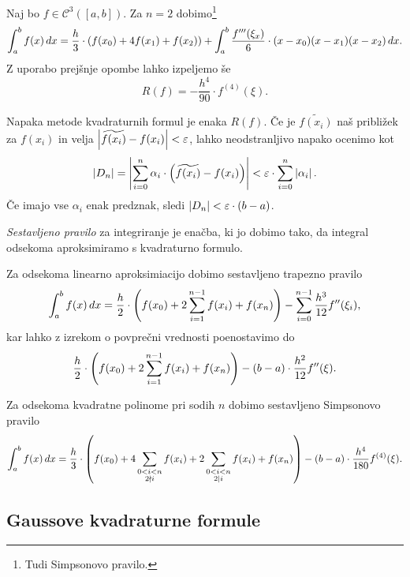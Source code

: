 \begin{opomba}
Naj bo $f \in \mathcal{C}^3([a,b])$. Za $n=2$ dobimo\footnote{Tudi
Simpsonovo pravilo.}
\[
\int_a^b f(x)\,dx =
\frac{h}{3} \cdot \left(f(x_0) + 4 f(x_1) + f(x_2)\right) +
\int_a^b \frac{f'''(\xi_x)}{6} \cdot (x-x_0)(x-x_1)(x-x_2)\,dx.
\]
Z uporabo prejšnje opombe lahko izpeljemo še
\[
R(f) = -\frac{h^4}{90} \cdot f^{(4)}(\xi).
\]
\end{opomba}

\begin{opomba}
Napaka metode kvadraturnih formul je enaka $R(f)$. Če je
$\widetilde{f(x_i)}$ naš približek za $f(x_i)$ in velja
$\left\lvert \widetilde{f(x_i)} - f(x_i)\right\rvert < \varepsilon$, lahko
neodstranljivo napako ocenimo kot
\[
\left\lvert D_n\right\rvert =
\left\lvert \sum_{i=0}^n \alpha_i \cdot \left(\widetilde{f(x_i)} - f(x_i)\right)\right\rvert
<
\varepsilon \cdot \sum_{i=0}^n \left\lvert \alpha_i\right\rvert.
\]
Če imajo vse $\alpha_i$ enak predznak, sledi
$\left\lvert D_n\right\rvert < \varepsilon \cdot (b-a)$.
\end{opomba}

\begin{definicija}
\emph{Sestavljeno pravilo} za integriranje je enačba, ki jo dobimo
tako, da integral odsekoma aproksimiramo s kvadraturno formulo.
\end{definicija}

\begin{opomba}
Za odsekoma linearno aproksimiacijo dobimo sestavljeno trapezno
pravilo
\[
\int_a^b f(x)\,dx =
\frac{h}{2} \cdot \left(f(x_0) + 2\sum_{i=1}^{n-1} f(x_i) + f(x_n)\right) -
\sum_{i=0}^{n-1} \frac{h^3}{12} f''(\xi_i),
\]
kar lahko z izrekom o povprečni vrednosti poenostavimo do
\[
\frac{h}{2} \cdot \left(f(x_0) + 2\sum_{i=1}^{n-1} f(x_i) + f(x_n)\right) -
(b-a) \cdot \frac{h^2}{12} f''(\xi).
\]
\end{opomba}

\begin{opomba}
Za odsekoma kvadratne polinome pri sodih $n$ dobimo sestavljeno
Simpsonovo pravilo
\[
\int_a^b f(x)\,dx =
\frac{h}{3} \cdot \left(f(x_0) +
4 \sum_{\substack{0 < i < n \\2 \nmid i}} f(x_i) +
2 \sum_{\substack{0 < i < n \\2 \mid i}} f(x_i) + f(x_n)\right) -
(b-a) \cdot \frac{h^4}{180} f^{(4)}(\xi).
\]
\end{opomba}

\newpage

\subsection{Gaussove kvadraturne formule}
\label{subs:gauss}

